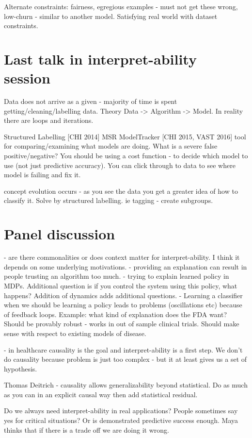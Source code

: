 \documentclass{article}
\theoremstyle{plain}
\theoremstyle{definition}
\begin{document}
Alternate constraints: fairness, egregious examples - must not get these wrong, low-churn - similar to another model. Satisfying real world with dataset constraints.  

\section{Last talk in interpret-ability session}
Data does not arrive as a given - majority of time is spent getting/cleaning/labelling data. Theory Data -> Algorithm -> Model. In reality there are loops and iterations.

Structured Labelling [CHI 2014] MSR
ModelTracker [CHI 2015, VAST 2016] tool for comparing/examining what models are doing. What is a severe false positive/negative? You should be using a cost function - to decide which model to use (not just predictive accuracy). You can click through to data to see where model is failing and fix it. 

concept evolution occurs - as you see the data you get a greater idea of how to classify it. Solve by structured labelling. ie tagging - create subgroups. 

\section{Panel discussion}
- are there commonalities or does context matter for interpret-ability. I think it depends on some underlying motivations. 
- providing an explanation can result in people trusting an algorithm too much. 
- trying to explain learned policy in MDPs. Additional question is if you control the system using this policy, what happens? Addition of dynamics adds additional questions. 
- Learning a classifier when we should be learning a policy leads to problems (oscillations etc) because of feedback loops.
Example: what kind of explanation does the FDA want? Should be provably robust - works in out of sample clinical trials. Should make sense with respect to existing models of disease. 

- in healthcare causality is the goal and interpret-ability is a first step. We don't do causality because problem is just too complex - but it at least gives us a set of hypothesis. 

Thomas Deitrich - causality allows generalizability beyond statistical.
Do as much as you can in an explicit causal way then add statistical residual. 

Do we always need interpret-ability in real applications? People sometimes say yes for critical situations? Or is demonstrated predictive success enough. Maya thinks that if there is a trade off we are doing it wrong. 
\end{document}
